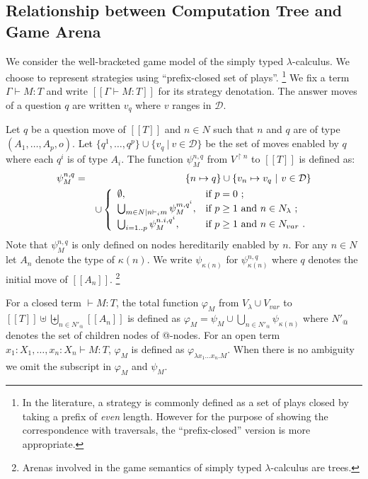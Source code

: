 \documentclass{llncs}
\newcommand\union{\cup}
\newcommand\Union{\bigcup}
\newcommand{\sem}[1]{{[\![ #1 ]\!]}}
\begin{document}
\subsection{Relationship between Computation Tree and Game Arena}
We consider the well-bracketed game model of the simply typed $\lambda$-calculus.
We choose to represent strategies using ``prefix-closed set of plays''.
\footnote{In the literature, a strategy is commonly defined as a set of plays
closed by taking a prefix of \emph{even} length. However for the purpose of showing the correspondence with traversals, the ``prefix-closed'' version is more appropriate.}
We fix a term $\Gamma \vdash M : T$ and write $\sem{\Gamma \vdash M : T}$ for its strategy denotation.
The answer moves of a question $q$ are written $v_q$ where $v$ ranges in $\mathcal{D}$.

\begin{definition}
\label{def:phi_psi mapping}
Let $q$ be a question move of $\sem{T}$ and $n \in N$ such that $n$ and $q$ are of type
$(A_1,\ldots,A_p,o)$.
Let $\{ q^1, \ldots, q^p \} \union \{  v_q \ | \ v \in \mathcal{D} \}$ be the set of moves enabled by $q$ where each $q^i$
is of type $A_i$. The function $\psi_M^{n,q}$ from $V^{\upharpoonright n}$ to $\sem{T}$ is defined as:
\begin{eqnarray*}
\psi^{n,q}_M &=& \{ n \mapsto q \} \union  \{ v_n \mapsto v_q \ | \ v \in \mathcal{D} \}\\
 &&\union \left\{
                \begin{array}{ll}
                  \emptyset, & \hbox{if $p=0$\ ;} \\
                  \Union_{m \in N | n \vdash_i m} \psi_M^{m, q^i}, & \hbox{if $p\geq1$ and $n\in N_{\lambda}$\ ;} \\
                  \Union_{i=1..p} \psi_M^{n.i, q^i}, & \hbox{if $p\geq1$ and $n\in N_{var}$\ .}
                \end{array}
              \right.
\end{eqnarray*}
Note that $\psi_M^{n,q}$ is only defined on nodes hereditarily enabled by $n$.
For any $n \in N$ let $A_n$ denote the type of $\kappa(n)$. We write $\psi_{\kappa(n)}$ for $\psi_{\kappa(n)}^{n,q}$ where $q$ denotes the initial move of $\sem{A_n}$. \footnote{Arenas involved in the game semantics of simply typed $\lambda$-calculus are trees.}


For a closed term $\vdash M : T$, the total function $\varphi_M$ from $V_\lambda \union V_{var}$ to $\sem{T} \uplus \biguplus_{n \in N'_@} \sem{A_n}$ is defined as $\varphi_M = \psi_M  \union \Union_{n \in N'_@} \psi_{\kappa(n)}$
where $N'_@$ denotes the set of children nodes of @-nodes.
For an open term $x_1 : X_1, \ldots, x_n : X_n \vdash M : T$, $\varphi_M$ is defined as
$\varphi_{\lambda x_1 \ldots x_n . M}$. When there is no ambiguity we omit the subscript in $\varphi_M$ and $\psi_M$.
\end{definition}
\end{document}
